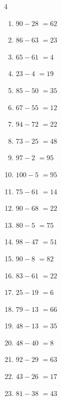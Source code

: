\begin{multicols}{4}
\begin{enumerate}
  \item $90-28$
        $=62$

  \item $86-63$
        $=23$

  \item $65-61$
        $=4$

  \item $23-4$
        $=19$

  \item $85-50$
        $=35$

  \item $67-55$
        $=12$

  \item $94-72$
        $=22$

  \item $73-25$
        $=48$

  \item $97-2$
        $=95$

  \item $100-5$
        $=95$

  \item $75-61$
        $=14$

  \item $90-68$
        $=22$

  \item $80-5$
        $=75$

  \item $98-47$
        $=51$

  \item $90-8$
        $=82$

  \item $83-61$
        $=22$

  \item $25-19$
        $=6$

  \item $79-13$
        $=66$

  \item $48-13$
        $=35$

  \item $48-40$
        $=8$

\columnbreak %

  \item $92-29$
        $=63$

  \item $43-26$
        $=17$

  \item $81-38$
        $=43$


\end{enumerate}
\end{multicols}
